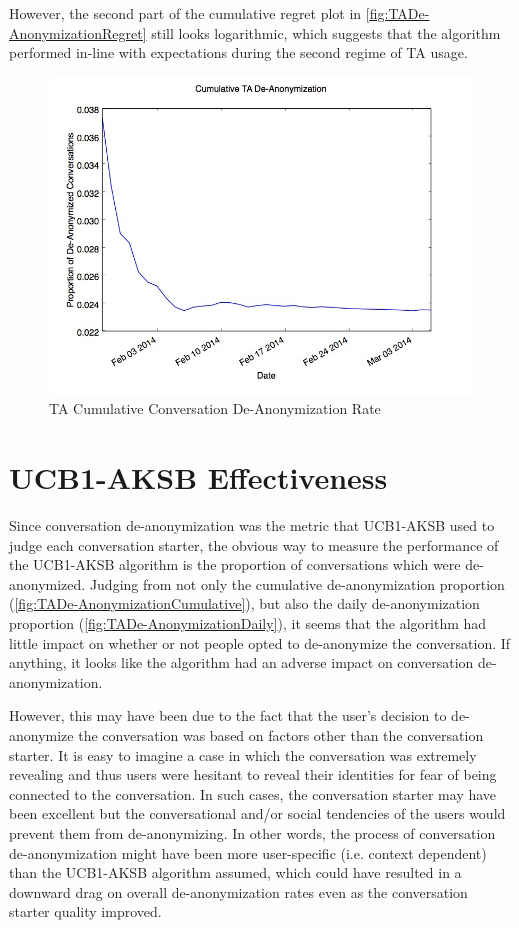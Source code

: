 However, the second part of the cumulative regret plot in \autoref{fig:TADe-AnonymizationRegret} still looks logarithmic, which suggests that the algorithm performed in-line with expectations during the second regime of TA usage.

\begin{figure}[H]
\centering
\includegraphics[trim= 0mm 0mm 0mm 0mm, clip, scale=0.5]{./Figures/CumulativeTADe-Anonymization.jpg}
\caption{TA Cumulative Conversation De-Anonymization Rate}
\label{fig:TADe-AnonymizationCumulative}
\end{figure}

\section{UCB1-AKSB Effectiveness}

Since conversation de-anonymization was the metric that UCB1-AKSB used to judge each conversation starter, the obvious way to measure the performance of the UCB1-AKSB algorithm is the proportion of conversations which were de-anonymized. Judging from not only the cumulative de-anonymization proportion (\autoref{fig:TADe-AnonymizationCumulative}), but also the daily de-anonymization proportion (\autoref{fig:TADe-AnonymizationDaily}), it seems that the algorithm had little impact on whether or not people opted to de-anonymize the conversation. If anything, it looks like the algorithm had an adverse impact on conversation de-anonymization.

However, this may have been due to the fact that the user's decision to de-anonymize the conversation was based on factors other than the conversation starter. It is easy to imagine a case in which the conversation was extremely revealing and thus users were hesitant to reveal their identities for fear of being connected to the conversation. In such cases, the conversation starter may have been excellent but the conversational and/or social tendencies of the users would prevent them from de-anonymizing. In other words, the process of conversation de-anonymization might have been more user-specific (i.e. context dependent) than the UCB1-AKSB algorithm assumed, which could have resulted in a downward drag on overall de-anonymization rates even as the conversation starter quality improved.

